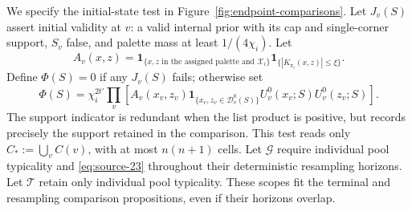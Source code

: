 We specify the initial-state test in
Figure~\ref{fig:endpoint-comparisons}. Let \(J_v(S)\) assert initial
validity at \(v\): a valid internal prior with its cap and
single-corner support, \(S_v\) false, and palette mass at least
\(1/(4\chi_i)\). Let
\[
 A_v(x,z)=\mathbf1_{\{x,z\text{ in the assigned palette and }\mathcal X_i\}}
             \mathbf1_{\{|K_{\pi_i}(x,z)|\le\xi\}}.
\]
Define \(\Phi(S)=0\) if any \(J_v(S)\) fails; otherwise set
\[
 \Phi(S)=\chi_i^{2t'}\prod_v
 \left[A_v(x_v,z_v)
   \mathbf1_{\{x_v,z_v\in\mathcal D_v^0(S)\}}
   U_v^0(x_v;S)U_v^0(z_v;S)\right].
\]
The support indicator is redundant when the list product is positive,
but records precisely the support retained in the comparison.
This test reads only \(C_*:=\bigcup_v C(v)\), with at most
\(n(n+1)\) cells. Let \(\mathcal G\) require individual pool
typicality and \eqref{eq:source-23} throughout their deterministic
resampling horizons. Let \(\mathcal T\) retain only individual
pool typicality. These scopes fit the terminal and resampling
comparison propositions, even if their horizons overlap.



